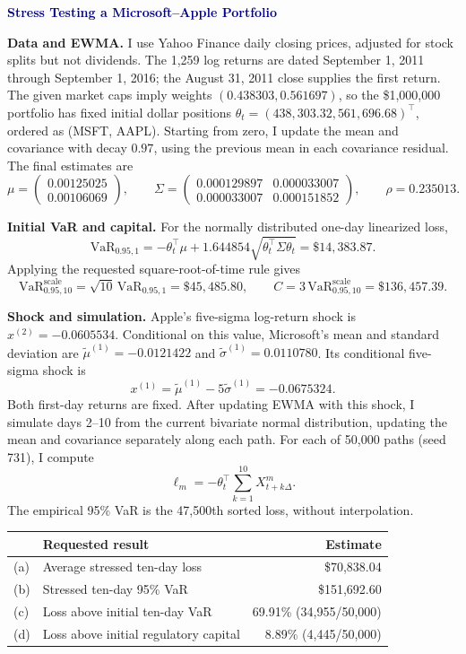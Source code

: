\documentclass[10pt,letterpaper]{article}
\begin{document}
{\Large\bfseries\textcolor{navy}{Stress Testing a Microsoft--Apple Portfolio}}

\textbf{Data and EWMA.}
I use Yahoo Finance daily closing prices, adjusted for stock splits but not
dividends. The 1,259 log returns are dated September 1, 2011 through
September 1, 2016; the August 31, 2011 close supplies the first return.
The given market caps imply weights $(0.438303,0.561697)$, so the
\$1,000,000 portfolio has fixed initial dollar positions
$\theta_t=(438{,}303.32,561{,}696.68)^\top$, ordered as (MSFT, AAPL).
Starting from zero, I update the mean and covariance with decay $0.97$,
using the previous mean in each covariance residual. The final estimates are
\[
\mu=\begin{pmatrix}0.00125025\\0.00106069\end{pmatrix},\qquad
\Sigma=\begin{pmatrix}
0.000129897&0.000033007\\
0.000033007&0.000151852
\end{pmatrix},\qquad \rho=0.235013.
\]

\textbf{Initial VaR and capital.}
For the normally distributed one-day linearized loss,
\[
\mathrm{VaR}_{0.95,1}
=-\theta_t^\top\mu+1.644854\sqrt{\theta_t^\top\Sigma\theta_t}
=\$14{,}383.87.
\]
Applying the requested square-root-of-time rule gives
\[
\mathrm{VaR}_{0.95,10}^{\mathrm{scale}}
=\sqrt{10}\,\mathrm{VaR}_{0.95,1}
=\boxed{\$45{,}485.80},\qquad
C=3\,\mathrm{VaR}_{0.95,10}^{\mathrm{scale}}
=\boxed{\$136{,}457.39}.
\]

\textbf{Shock and simulation.}
Apple's five-sigma log-return shock is $x^{(2)}=-0.0605534$.
Conditional on this value, Microsoft's mean and standard deviation are
$\widetilde\mu^{(1)}=-0.0121422$ and
$\widetilde\sigma^{(1)}=0.0110780$. Its conditional five-sigma shock is
\[
x^{(1)}=\widetilde\mu^{(1)}-5\widetilde\sigma^{(1)}=-0.0675324.
\]
Both first-day returns are fixed. After updating EWMA with this shock,
I simulate days 2--10 from the current bivariate normal distribution,
updating the mean and covariance separately along each path.
For each of 50,000 paths (seed 731), I compute
\[
\ell_m=-\theta_t^\top\sum_{k=1}^{10}X_{t+k\Delta}^{m}.
\]
The empirical 95\% VaR is the 47,500th sorted loss, without interpolation.

\begin{center}
\begin{tabular}{llr}\toprule
 & Requested result & Estimate\\\midrule
(a) & Average stressed ten-day loss & \$70,838.04\\
(b) & Stressed ten-day 95\% VaR & \$151,692.60\\
(c) & Loss above initial ten-day VaR & 69.91\% \; (34,955/50,000)\\
(d) & Loss above initial regulatory capital & 8.89\% \; (4,445/50,000)\\\bottomrule
\end{tabular}
\end{center}
\end{document}

